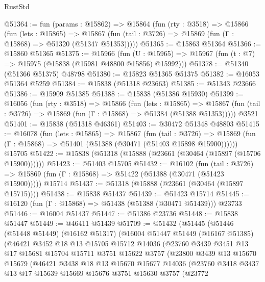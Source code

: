 \begin{lexlean}{RustStd}
\begin{coremodule}
@51364 := fun (params : @15862) =>
  @15864
    (fun (rty : @3518) =>
    @15866
      (fun (lets : @15865) =>
      @15867 (fun (tail : @3726) => @15869 (fun (Γ : @15868) => @51320 (@51347 @51353)))))
@51365 := @15863 @51364
@51366 := @15860 @51365
@51375 := @15966
    (fun (U : @15965) => @15967 (fun (t : @7) => @15975 (@15838 (@15981 @48800 @15856) @15992)))
@51378 := @51340 (@51366 @51375) @48798
@51380 := @15823 @51365 @51375
@51382 := @16053 @51364 @5259
@51384 := @15838 (@51318 @23663)
@51385 := @51343 @23666
@51386 := @15909 @51385
@51388 := @15838 (@51386 @15930)
@51399 := @16056
    (fun (rty : @3518) =>
    @15866
      (fun (lets : @15865) =>
      @15867 (fun (tail : @3726) => @15869 (fun (Γ : @15868) => @51384 (@51388 @51353)))))
    @3521
@51401 := @15838 (@51318 @46361)
@51403 := @30472 @51348 @48803
@51415 := @16078
    (fun (lets : @15865) =>
    @15867
      (fun (tail : @3726) =>
      @15869 (fun (Γ : @15868) => @51401 (@51388 (@30471 (@51403 @15898 @15900))))))
    @15705
@51422 := @15838 (@51318 (@15888 (@23661 (@30464 (@15897 (@15706 @15900))))))
@51423 := @51403 @15705
@51432 := @16102
    (fun (tail : @3726) => @15869 (fun (Γ : @15868) => @51422 (@51388 (@30471 (@51423 @15900)))))
    @15714
@51437 := @51318 (@15888 (@23661 (@30464 (@15897 @15715))))
@51438 := @15838 @51437
@51439 := @51423 @15714
@51445 := @16120 (fun (Γ : @15868) => @51438 (@51388 (@30471 @51439))) @23733
@51446 := @16004 @51437
@51447 := @51386 @23736
@51448 := @15838 @51447
@51449 := @46411 @51439
@51709 := @51432
    (@51445
      (@51446
        (@51448 @51449)
        (@16162 @51317)
        (@16004
          @51447
          @51449
          (@16167 @51385)
          (@46421
            @3452
            @18
            @13
            @15705
            @15712
            @14036
            (@23760
              @3439
              @3451
              @13
              @17
              @15681
              @15704
              @15711
              @3751
              @15622
              @3757
              (@23800
                @3439
                @13
                @15670
                @15679
                (@46421
                  @3438
                  @18
                  @13
                  @15670
                  @15677
                  @14036
                  (@23760
                    @3418
                    @3437
                    @13
                    @17
                    @15639
                    @15669
                    @15676
                    @3751
                    @15630
                    @3757
                    (@23772

\end{coremodule}
\end{lexlean}
